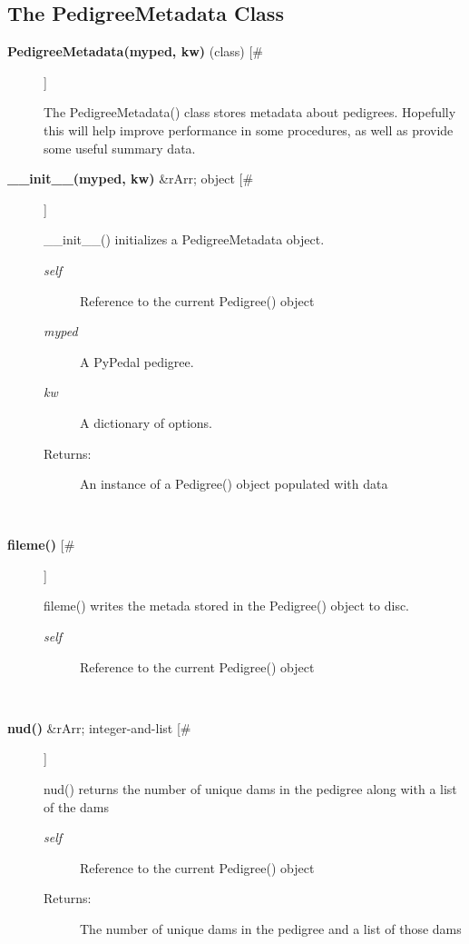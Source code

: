 \subsection*{The PedigreeMetadata Class}
\begin{description}
\item[\textbf{PedigreeMetadata(myped, kw)}
 (class) [\#]]

 The PedigreeMetadata() class stores metadata about pedigrees. Hopefully this will help improve performance in some procedures, as well as provide some useful summary data.

\item[\textbf{\_\_init\_\_(myped, kw)}
 \&rArr; object [\#]]

 \_\_init\_\_() initializes a PedigreeMetadata object.
\begin{description}
\item[\emph{self}
] Reference to the current Pedigree() object
\item[\emph{myped}
] A PyPedal pedigree.
\item[\emph{kw}
] A dictionary of options.
\item[Returns:] An instance of a Pedigree() object populated with data

\end{description}
\\ 

\item[\textbf{fileme()}
 [\#]]

 fileme() writes the metada stored in the Pedigree() object to disc.
\begin{description}
\item[\emph{self}
] Reference to the current Pedigree() object

\end{description}
\\ 

\item[\textbf{nud()}
 \&rArr; integer-and-list [\#]]

 nud() returns the number of unique dams in the pedigree along with a list of the dams
\begin{description}
\item[\emph{self}
] Reference to the current Pedigree() object
\item[Returns:] The number of unique dams in the pedigree and a list of those dams

\end{description}
\\ 


\end{description}
